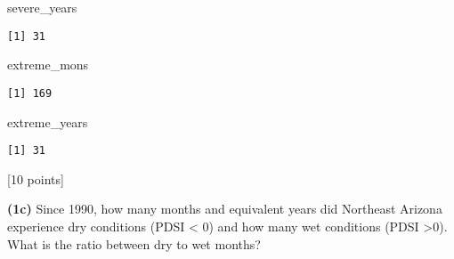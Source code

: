 \documentclass[
  letterpaper,
  DIV=11,
  numbers=noendperiod]{scrartcl}
\newenvironment{Shaded}{\begin{snugshade}}{\end{snugshade}}
\newcommand{\NormalTok}[1]{\textcolor[rgb]{0.00,0.23,0.31}{#1}}
\begin{document}
\begin{Shaded}
\begin{Highlighting}[]
\NormalTok{severe\_years}
\end{Highlighting}
\end{Shaded}

\begin{verbatim}
[1] 31
\end{verbatim}

\begin{Shaded}
\begin{Highlighting}[]
\NormalTok{extreme\_mons}
\end{Highlighting}
\end{Shaded}

\begin{verbatim}
[1] 169
\end{verbatim}

\begin{Shaded}
\begin{Highlighting}[]
\NormalTok{extreme\_years}
\end{Highlighting}
\end{Shaded}

\begin{verbatim}
[1] 31
\end{verbatim}

{[}10 points{]}

\textbf{(1c)} Since 1990, how many months and equivalent years did
Northeast Arizona experience dry conditions (PDSI \textless{} 0) and how
many wet conditions (PDSI \textgreater0). What is the ratio between dry
to wet months?
\end{document}
